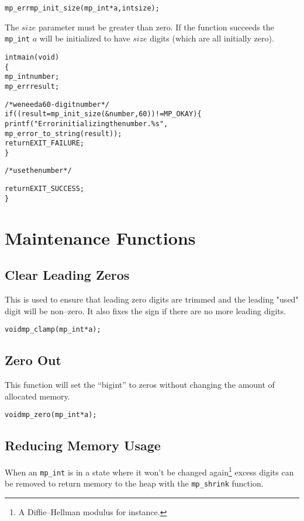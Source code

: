 \documentclass[synpaper]{book}
\begin{document}
\begin{alltt}
mp_err mp_init_size (mp_int *a, int size);
\end{alltt}

The $size$ parameter must be greater than zero.  If the function succeeds the \texttt{mp\_int} $a$
will be initialized to have $size$ digits (which are all initially zero).

\begin{small}
  \begin{alltt}
int main(void)
\{
   mp_int number;
   mp_err result;

   /* we need a 60-digit number */
   if ((result = mp_init_size(&number, 60)) != MP_OKAY) \{
      printf("Error initializing the number.  \%s",
             mp_error_to_string(result));
      return EXIT_FAILURE;
   \}

   /* use the number */

   return EXIT_SUCCESS;
\}
\end{alltt}
\end{small}

\section{Maintenance Functions}
\subsection{Clear Leading Zeros}

This is used to ensure that leading zero digits are trimmed and the leading "used" digit will be
non--zero. It also fixes the sign if there are no more leading digits.

\begin{alltt}
void mp_clamp(mp_int *a);
\end{alltt}

\subsection{Zero Out}

This function will set the ``bigint'' to zeros without changing the amount of allocated memory.

\begin{alltt}
void mp_zero(mp_int *a);
\end{alltt}

\subsection{Reducing Memory Usage}
When an \texttt{mp\_int} is in a state where it won't be changed again\footnote{A Diffie--Hellman
  modulus for instance.} excess digits can be removed to return memory to the heap with the
\texttt{mp\_shrink} function.
\end{document}

